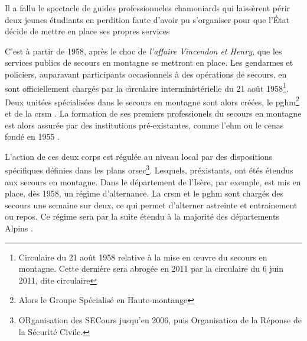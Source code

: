\begin{displayquote}
  \og Il a fallu le spectacle de guides professionneles chamoniards
  qui laissèrent périr deux jeunes étudiants en perdition faute
  d'avoir pu s'organiser pour que l'État décide de mettre en place ses
  propres services \textelp{}\fg{}
\end{displayquote}

C'est à partir de 1958, après le choc de \emph{l'affaire Vincendon et
  Henry,} que les services publics de secours en montagne se mettront
en place. Les gendarmes et policiers, auparavant participants
occasionnels à des opérations de
secours, en sont officiellement
chargés par la circulaire interministérielle du 21 août
1958\footnote{Circulaire  du 21 août 1958 relative à la mise
  en œuvre du secours en montagne. Cette dernière sera abrogée en 2011
  par la circulaire du 6 juin 2011, dite circulaire }. Deux
unitées spécialisées dans le secours en montagne sont alors créées, le
\ac{pghm}\footnote{Alors le Groupe Spécialisé en Haute-montange} et de
la \ac{crsm} \autocite{Halle2007}. La formation de ses premiers
professionels du secours en montagne est alors assurée par des
institutions pré-existantes, comme l'\ac{ehm} ou le \ac{cenas} fondé
en 1955 \autocite{Mezin}.

L'action de ces deux corps est régulée au niveau local par des
dispositions spécifiques définies dans les plans
\ac{orsec}\footnote{ORganisation des SECours jusqu'en 2006, puis
  Organisation de la Réponse de la Sécurité Civile.}. Lesquels,
préxistants, ont étés étendus aux secours en montagne. Dans le
département de l'Isère, par exemple, est mis en place, dès 1958, un
régime d'alternance. La \ac{crsm} et le \ac{pghm} sont chargés des
secours une semaine sur deux, ce qui permet d'alterner astreinte et
entrainement ou repos. Ce régime sera par la suite étendu à la
majorité des départements Alpins \autocite{Halle2007}.

